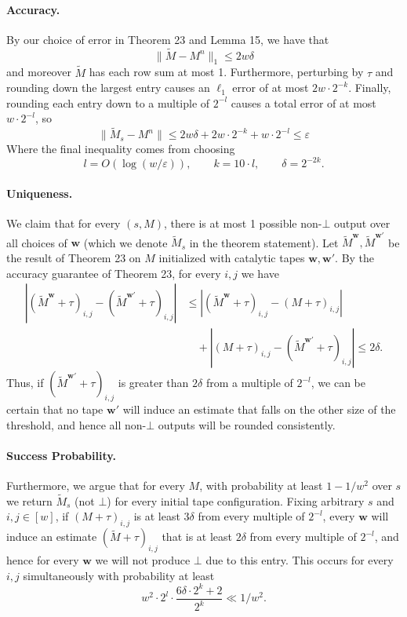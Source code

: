 \documentclass[10pt,a4paper]{article}
\begin{document}
\paragraph{Accuracy.} By our choice of error in Theorem 23 and Lemma 15, we have that
\[\|\widetilde M-M^n\|_1\leq2w\delta\]
and moreover $\widetilde M$ has each row sum at most 1. Furthermore, perturbing by $\tau$ and rounding down the largest entry causes an $\ell_1$ error of at most $2w\cdot2^{-k}$. Finally, rounding each entry down to a multiple of $2^{-l}$ causes a total error of at most $w\cdot2^{-l}$, so
\[\|\widetilde M_s-M^n\|\leq2w\delta+2w\cdot2^{-k}+w\cdot2^{-l}\leq\varepsilon\]
Where the final inequality comes from choosing
\[l=O(\log(w/\varepsilon)),\qquad k=10\cdot l,\qquad\delta=2^{-2k}.\]
\paragraph{Uniqueness.} We claim that for every $(s,M)$, there is at most 1 possible non-$\bot$ output over all choices of $\mathbf w$ (which we denote $\widetilde M_s$ in the theorem statement). Let $\widetilde M^{\mathbf w},\widetilde M^{\mathbf w'}$ be the result of Theorem 23 on $M$ initialized with catalytic tapes $\mathbf w,\mathbf w'$. By the accuracy guarantee of Theorem 23, for every $i,j$ we have
\begin{align*}
|(\widetilde M^{\mathbf w}+\tau)_{i,j}-(\widetilde M^{\mathbf w'}+\tau)_{i,j}|&\leq|(\widetilde M^{\mathbf w}+\tau)_{i,j}-(M+\tau)_{i,j}|\\
&\quad+|(M+\tau)_{i,j}-(\widetilde M^{\mathbf w'}+\tau)_{i,j}|\leq2\delta.
\end{align*}
Thus, if $(\widetilde M^{\mathbf w'}+\tau)_{i,j}$ is greater than $2\delta$ from a multiple of $2^{-l}$, we can be certain that no tape $\mathbf w'$ will induce an estimate that falls on the other size of the threshold, and hence all non-$\bot$ outputs will be rounded consistently.
\paragraph{Success Probability.} Furthermore, we argue that for every $M$, with probability at least $1-1/w^2$ over $s$ we return $\widetilde M_s$ (not $\bot$) for every initial tape configuration. Fixing arbitrary $s$ and $i,j\in[w]$, if $(M+\tau)_{i,j}$ is at least $3\delta$ from every multiple of $2^{-l}$, every $\mathbf w$ will induce an estimate $(\widetilde M+\tau)_{i,j}$ that is at least $2\delta$ from every multiple of $2^{-l}$, and hence for every $\mathbf w$ we will not produce $\bot$ due to this entry. This occurs for every $i,j$ simultaneously with probability at least
\[w^2\cdot2^l\cdot\frac{6\delta\cdot2^k+2}{2^k}\ll1/w^2.\]
\end{document}
